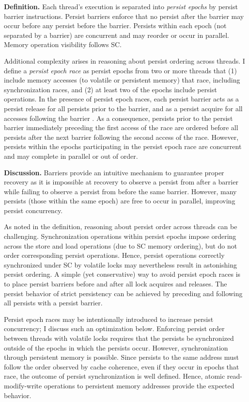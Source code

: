 \textbf{Definition.}
Each thread's execution is separated into \emph{persist epochs} by persist barrier instructions.
Persist barriers enforce that no persist after the barrier may occur before any persist before the barrier.
Persists within each epoch (not separated by a barrier) are concurrent and may reorder or occur in parallel.
Memory operation visibility follows SC.

Additional complexity arises in reasoning about persist ordering across threads. 
I define a \emph{persist epoch race} as persist epochs from two or more threads that (1) include memory accesses (to volatile or persistent memory) that race, including synchronization races, and (2) at least two of the epochs include persist operations. 
In the presence of persist epoch races, each persist barrier acts as a persist release for all persists prior to the barrier, and as a persist acquire for all accesses following the barrier \cite{Gharachorloo90}.
As a consequence, persists prior to the persist barrier immediately preceding the first access of the race are ordered before all persists after the next barrier following the second access of the race.
However, persists within the epochs participating in the persist epoch race are concurrent and may complete in parallel or out of order.

\textbf{Discussion.}
Barriers provide an intuitive mechanism to guarantee proper recovery as it is impossible at recovery to observe a persist from after a barrier while failing to observe a persist from before the same barrier.
However, many persists (those within the same epoch) are free to occur in parallel, improving persist concurrency.

As noted in the definition, reasoning about persist order across threads can be challenging.
Synchronization operations within persist epochs impose ordering across the store and load operations (due to SC memory ordering), but do not order corresponding persist operations.
Hence, persist operations correctly synchronized under SC by volatile locks may nevertheless result in astonishing persist ordering.
A simple (yet conservative) way to avoid persist epoch races is to place persist barriers before and after all lock acquires and releases.
The persist behavior of strict persistency can be achieved by preceding and following all persists with a persist barrier.

Persist epoch races may be intentionally introduced to increase persist concurrency; I discuss such an optimization below.
Enforcing persist order between threads with volatile locks requires that the persists be synchronized outside of the epochs in which the persists occur.
However, synchronization through persistent memory is possible.
Since persists to the same address must follow the order observed by cache coherence, even if they occur in epochs that race, the outcome of persist synchronization is well defined.
Hence, atomic read-modify-write operations to persistent memory addresses provide the expected behavior.

